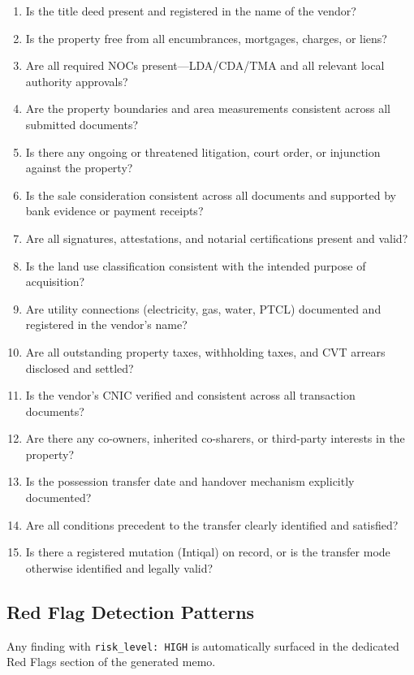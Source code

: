 \documentclass[12pt, a4paper]{article}
\begin{document}
\begin{enumerate}[leftmargin=1.5cm, label=\textbf{Q\arabic*.}]
    \item Is the title deed present and registered in the name of the vendor?
    \item Is the property free from all encumbrances, mortgages, charges, or liens?
    \item Are all required NOCs present---LDA/CDA/TMA and all relevant local
    authority approvals?
    \item Are the property boundaries and area measurements consistent across all
    submitted documents?
    \item Is there any ongoing or threatened litigation, court order, or injunction
    against the property?
    \item Is the sale consideration consistent across all documents and supported
    by bank evidence or payment receipts?
    \item Are all signatures, attestations, and notarial certifications present
    and valid?
    \item Is the land use classification consistent with the intended purpose of
    acquisition?
    \item Are utility connections (electricity, gas, water, PTCL) documented and
    registered in the vendor's name?
    \item Are all outstanding property taxes, withholding taxes, and CVT arrears
    disclosed and settled?
    \item Is the vendor's CNIC verified and consistent across all transaction
    documents?
    \item Are there any co-owners, inherited co-sharers, or third-party interests
    in the property?
    \item Is the possession transfer date and handover mechanism explicitly
    documented?
    \item Are all conditions precedent to the transfer clearly identified and
    satisfied?
    \item Is there a registered mutation (Intiqal) on record, or is the transfer
    mode otherwise identified and legally valid?
\end{enumerate}

\subsection{Red Flag Detection Patterns}

Any finding with \texttt{risk\_level: HIGH} is automatically surfaced in the
dedicated Red Flags section of the generated memo.
\end{document}
